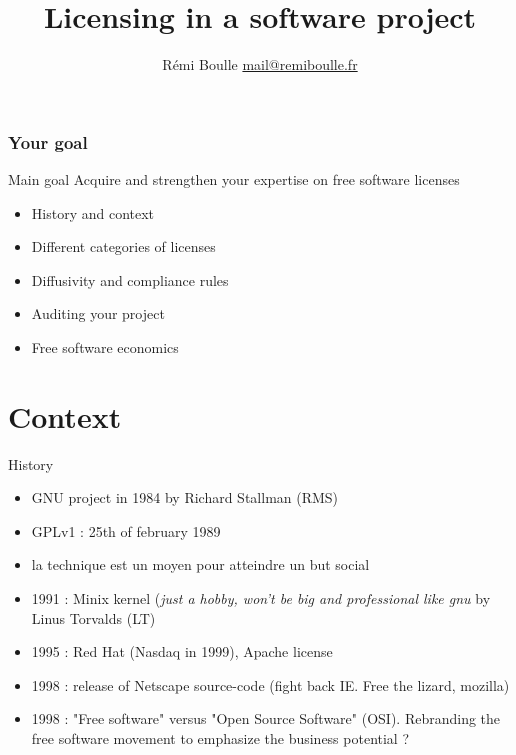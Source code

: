 \documentclass{beamer}
\title[]{Licensing in a software project}
\author{Rémi Boulle  \href{mailto:mail@remiboulle.fr}{mail@remiboulle.fr}}
\date{}
\institute{}
\begin{document}


\begin{frame}
  \titlepage
\end{frame}



\begin{frame}
\frametitle{Your goal}
\begin{alertblock}{Main goal}
  Acquire and strengthen your expertise on free software licenses
\end{alertblock}


  \begin{itemize}
  \item History and context
  \item Different categories of licenses
  \item Diffusivity and compliance rules
  \item Auditing your project
  \item Free software economics
  \end{itemize}
\end{frame}


\section{Context}

\begin{frame}{History}
  \begin{itemize}
  \item GNU project in 1984 by Richard Stallman (RMS)
  \item GPLv1 : 25th of february 1989
  \item la technique est un moyen pour atteindre un but social
  \item 1991 : Minix kernel (\textit{just a hobby, won't be big and professional like gnu} by Linus Torvalds (LT)
  \item 1995 : Red Hat (Nasdaq in 1999), Apache license
  \item 1998 : release of Netscape source-code (fight back IE. Free the lizard, mozilla)
  \item 1998 : "Free software" versus "Open Source Software" (OSI). Rebranding the free software movement to emphasize the business potential ? 
  \end{itemize}
\end{frame}
\end{document}
